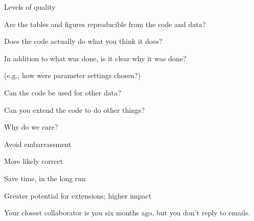 \documentclass[12pt,t]{beamer}
\begin{document}
\begin{frame}{Levels of quality}


\vspace{24pt}

\bi
\itemsep12pt
\item Are the tables and figures reproducible from the code and data?
\item Does the code actually do what you think it does?
\item In addition to {\color{hilit} what} was done, is it clear
  {\color{hilit} why} it was done?
  \bi
  \item[] (e.g., how were parameter settings chosen?)
  \ei
\item Can the code be used for other data?
\item Can you extend the code to do other things?
\ei

\end{frame}


\begin{frame}{Why do we care?}

\vspace{24pt}

\bi
\itemsep12pt
\item Avoid embarrassment
\item More likely correct
\item Save time, in the long run
\item Greater potential for extensions; higher impact
\ei

\end{frame}


\begin{frame}[c]{}

\centering
\large
Your closest collaborator is you six months ago, but you
don't reply to emails.
\end{frame}
\end{document}
